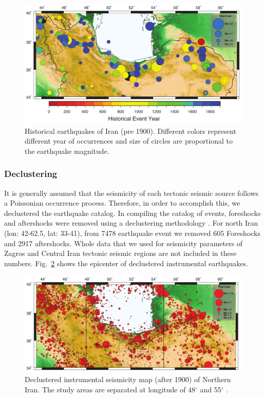 \begin{figure}[!ht] 

\centering
\includegraphics[scale=0.8]{figures/pdf/Figure2.pdf} 
\caption{Historical earthquakes of Iran (pre 1900). Different colors represent different year of occurrences and size of circles are proportional to the earthquake magnitude. }
\label{fig:historical}
\end{figure}


\subsubsection{Declustering}

It is generally assumed that the seismicity of each tectonic seismic source follows a Poissonian occurrence process. Therefore, in order to accomplish this, we declustered the earthquake catalog. In compiling the catalog of events, foreshocks and aftershocks were removed using a declustering methodology \citep{Gardner1974}. For north Iran (lon: 42-62.5, lat: 33-41), from 7478 earthquake event we removed 605 Foreshocks and 2917 aftershocks.
Whole data that we used for seismicity parameters of Zagros and Central Iran tectonic seismic regions are not included in these numbers. Fig.~\ref{fig:instrumental} shows the epicenter of declustered instrumental  earthquakes.


\begin{figure}[!ht] 

\centering
\includegraphics[scale=0.8]{figures/pdf/Figure3.pdf} 
\caption{Declustered instrumental seismicity map (after 1900) of Northern Iran. The study areas are separated at longitude of 48$^{\circ}$ and 55$^{\circ}$ . } 
\label{fig:instrumental}
\end{figure}


